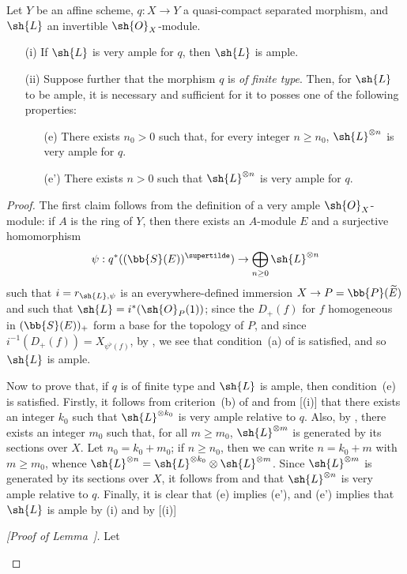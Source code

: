 \begin{proposition}[4.5.10]
\label{II.4.5.10}
Let $Y$ be an affine scheme, $q:X\to Y$ a quasi-compact separated morphism, and $\sh{L}$ an invertible $\sh{O}_X$-module.
\begin{enumerate}
  \item[\rm{(i)}] If $\sh{L}$ is very ample for $q$, then $\sh{L}$ is ample.
  \item[\rm{(ii)}] Suppose further that the morphism $q$ is \emph{of finite type}.
    Then, for $\sh{L}$ to be ample, it is necessary and sufficient for it to posses one of the following properties:
    \begin{enumerate}
      \item[\rm{(e)}] There exists $n_0>0$ such that, for every integer $n\geq n_0$, $\sh{L}^{\otimes n}$ is very ample for $q$.
      \item[\rm{(e')}] There exists $n>0$ such that $\sh{L}^{\otimes n}$ is very ample for $q$.
    \end{enumerate}
\end{enumerate}
\end{proposition}

\begin{proof}
The first claim follows from the definition  of a very ample $\sh{O}_X$-module: if $A$ is the ring of $Y$, then there exists an $A$-module $E$ and a surjective homomorphism
\[
  \psi: q^*((\bb{S}(E))^{\supertilde}) \to \bigoplus_{n\geq0}\sh{L}^{\otimes n}
\]
such that $i=r_{\sh{L},\psi}$ is an everywhere-defined immersion $X\to P=\bb{P}(\widetilde{E})$ and such that $\sh{L}=i^*(\sh{O}_P(1))$;
since the $D_+(f)$ for $f$ homogeneous in $(\bb{S}(E))_+$ form a base for the topology of $P$, and since $i^{-1}(D_+(f))=X_{\psi^\flat(f)}$, by , we see that condition~(a) of  is satisfied, and so $\sh{L}$ is ample.

Now to prove that, if $q$ is of finite type and $\sh{L}$ is ample, then condition~(e) is satisfied.
Firstly, it follows from criterion~(b) of  and from [(i)] that there exists
an integer $k_0$ such that $\sh{L}^{\otimes k_0}$ is very ample relative to $q$.
Also, by , there exists an integer $m_0$ such that, for all $m\geq m_0$, $\sh{L}^{\otimes m}$ is generated by its sections over $X$.
Let $n_0=k_0+m_0$;
if $n\geq n_0$, then we can write $n=k_0+m$ with $m\geq m_0$, whence $\sh{L}^{\otimes n}=\sh{L}^{\otimes k_0}\otimes\sh{L}^{\otimes m}$.
Since $\sh{L}^{\otimes m}$ is generated by its sections over $X$, it follows from  and  that $\sh{L}^{\otimes n}$ is very ample relative to $q$.
Finally, it is clear that (e) implies (e'), and (e') implies that $\sh{L}$ is ample by (i) and by [(i)]

  \begin{env}[4.5.10.1]
  \label{II.4.5.10.1}
  \emph{[Proof of Lemma~].}  
  Let
  \end{env}
\end{proof}



